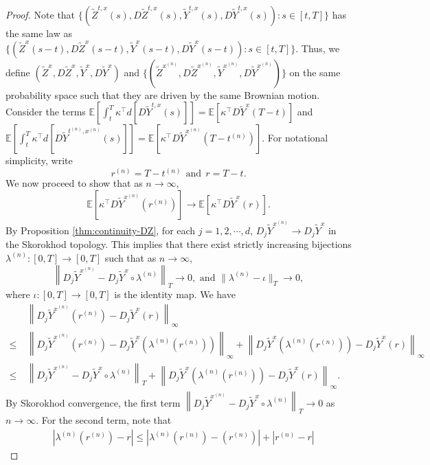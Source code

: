 \documentclass[11pt]{article}
\theoremstyle{definition}
\theoremstyle{plain}
\newcommand{\E}{\mathbb{E}}
\begin{document}
\begin{appendices}
\begin{proof}
Note that 
$\{ (\tilde{Z}^{t,x}(s), D \tilde{Z}^{t,x}(s), \tilde{Y}^{t,x}(s), D \tilde{Y}^{t,x}(s)) : s \in [t, T] \}$
has the same law as $\{ (\tilde{Z}^{x}(s - t), D \tilde{Z}^x(s - t), \tilde{Y}^{x}(s - t), D \tilde{Y}^x(s - t)) : s \in [t, T] \}$.
Thus, we define \( (\tilde{Z}^x, D \tilde{Z}^x, \tilde{Y}^x, D \tilde{Y}^x) \) and \( \{ (\tilde{Z}^{x^{(n)}}, D \tilde{Z}^{x^{(n)}}, \tilde{Y}^{x^{(n)}}, D \tilde{Y}^{x^{(n)}}) \} \)  
on the same probability space such that  
they are driven by the same Brownian motion. 
Consider the terms $\E\left[\int_t^T \kappa^{\top} d\left[D\tilde Y^{t,x}(s)\right]\right] = \E\left[\kappa^{\top} D\tilde Y^{x}(T-t)\right]$ 
and $\E\left[\int_t^T \kappa^{\top} d\left[D\tilde Y^{t^{(n)},x^{(n)}}(s)\right]\right] = \E\left[\kappa^{\top} D\tilde Y^{x^{(n)}}(T-t^{(n)})\right]$. 
For notational simplicity, write 
\begin{equation}\label{eq:rn-and-r}
r^{(n)} = T - t^{(n)} \ \ \text{and} \ \ r = T - t.
\end{equation}
We now proceed to show that as $n \to \infty$, 
\[
\E\left[\kappa^{\top} D\tilde Y^{x^{(n)}}(r^{(n)})\right] \to \E\left[\kappa^{\top} D\tilde Y^{x}(r)\right].
\]
By Proposition \ref{thm:continuity-DZ}, for each $j = 1, 2, \cdots, d$, $D_j\tilde Y^{x^{(n)}} \to D_j\tilde Y^{x}$ in the Skorokhod topology. 
This implies that there exist strictly increasing bijections $\lambda^{(n)} : [0,T] \to [0,T]$ such that as $n \to \infty$, 
\[
\left\|D_j\tilde Y^{x^{(n)}}  - D_j\tilde Y^{x} \circ \lambda^{(n)} \right\|_T \to 0, \text{ and } \|\lambda^{(n)} - \iota\|_T \to 0,
\]
where $\iota : [0,T] \to [0, T]$ is the identity map. We have
\begin{align*}
&~\left\|D_j\tilde Y^{x^{(n)}}(r^{(n)}) - D_j\tilde Y^{x}(r)\right\|_\infty \\
\le &~\left\|D_j\tilde Y^{x^{(n)}}(r^{(n)}) - D_j\tilde Y^{x}(\lambda^{(n)}(r^{(n)}))\right\|_\infty+\left\|D_j\tilde Y^{x}(\lambda^{(n)}(r^{(n)})) - D_j\tilde Y^{x}(r)\right\|_\infty \\
\le &~\left\|D_j\tilde Y^{x^{(n)}}  - D_j\tilde Y^{x} \circ \lambda^{(n)} \right\|_T + \left\|D_j\tilde Y^{x}(\lambda^{(n)}(r^{(n)})) - D_j\tilde Y^{x}(r)\right\|_\infty.
\end{align*}
By Skorokhod convergence, the first term $\left\|D_j\tilde Y^{x^{(n)}}  - D_j\tilde Y^{x} \circ \lambda^{(n)} \right\|_T \to 0$ as $n \to \infty$. 
For the second term, note that 
\begin{align*}
&~\left| \lambda^{(n)} (r^{(n)}) - r\right| 
\le  \left| \lambda^{(n)} (r^{(n)}) - (r^{(n)}) \right| + |r^{(n)} - r| 

\end{align*}
\end{proof}
\end{appendices}
\end{document}
